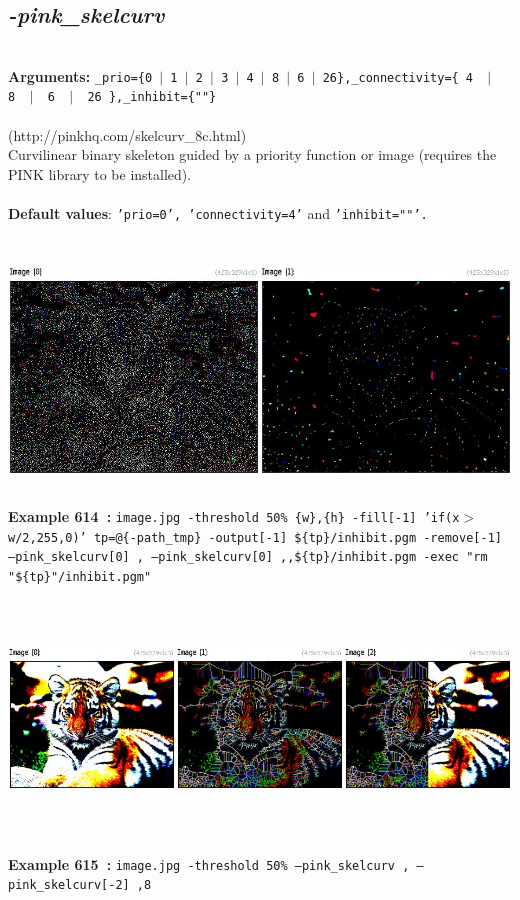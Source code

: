 \documentclass[a4paper,11pt,twoside]{book}
\begin{document}
\subsection{\emph{-pink\_skelcurv} }\vspace*{-0.5em}
~\\\textbf{Arguments: } 
{\small \texttt{\_prio=\{0~$|$~1~$|$~2~$|$~3~$|$~4~$|$~8~$|$~6~$|$~26\},\_connectivity=\{ 4 ~$|$~ 8 ~$|$~ 6 ~$|$~ 26 \},\_inhibit=\{""\}}}\\~\\
(http://pinkhq.com/skelcurv\_8c.html)
~\\Curvilinear binary skeleton guided by a priority function or image (requires the PINK library to be installed).
~\\~\\\textbf{Default values}: {\small \texttt{'prio=0', 'connectivity=4'} and \texttt{'inhibit=""'.}}
\begin{center}\includegraphics[keepaspectratio=true,height=7cm,width=\textwidth]{img/gmic_def614.jpg}\\
{\footnotesize \textbf{Example 614~:} \texttt{image.jpg -threshold 50\% \{w\},\{h\} -fill[-1] 'if(x$>$w/2,255,0)' tp=@\{-path\_tmp\} -output[-1] \$\{tp\}/inhibit.pgm -remove[-1] --pink\_skelcurv[0] , --pink\_skelcurv[0] ,,\$\{tp\}/inhibit.pgm -exec "rm "\$\{tp\}"/inhibit.pgm"}}
\\\includegraphics[keepaspectratio=true,height=7cm,width=\textwidth]{img/gmic_def615.jpg}\\
{\footnotesize \textbf{Example 615~:} \texttt{image.jpg -threshold 50\% --pink\_skelcurv , --pink\_skelcurv[-2] ,8}}
\end{center}
\end{document}
